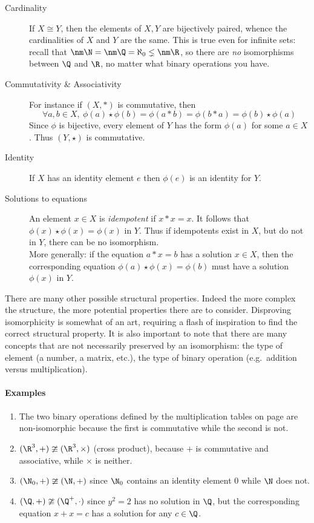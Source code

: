 \begin{description}
  \item[Cardinality] If $X\cong Y$, then the elements of $X,Y$ are bijectively paired, whence the cardinalities of $X$ and $Y$ are the same. This is true even for infinite sets: recall that $\nm\N=\nm\Q=\aleph_0\lneq \nm\R$, so there are \emph{no} isomorphisms between $\Q$ and $\R$, no matter what binary operations you have.
  \item[Commutativity \& Associativity] For instance if $(X,\ast)$ is commutative, then
  \[\forall a,b\in X,\ \phi(a)\star\phi(b)=\phi(a*b)=\phi(b*a)=\phi(b)\star\phi(a)\]
  Since $\phi$ is bijective, every element of $Y$ has the form $\phi(a)$ for some $a\in X$. Thus $(Y,\star)$ is commutative.
  \item[Identity] If $X$ has an identity element $e$ then $\phi(e)$ is an identity for $Y$.
  \item[Solutions to equations] An element $x\in X$ is \emph{idempotent} if $x*x=x$. It follows that $\phi(x)\star\phi(x)=\phi(x)$ in $Y$. Thus if idempotents exist in $X$, but do not in $Y$, there can be no isomorphism.\\
  More generally: if the equation $a*x=b$ has a solution $x\in X$, then the corresponding equation $\phi(a)\star\phi(x)=\phi(b)$ must have a solution $\phi(x)$ in $Y$.
\end{description}

There are many other possible structural properties. Indeed the more complex the structure, the more potential properties there are to consider. Disproving isomorphicity is somewhat of an art, requiring a flash of inspiration to find the correct structural property. It is also important to note that there are many concepts that are not necessarily preserved by an isomorphism: the type of element (a number, a matrix, etc.), the type of binary operation (e.g.\ addition versus multiplication).

\paragraph{Examples}
\begin{enumerate}
	\item The two binary operations defined by the multiplication tables on page \pageref{eq:commute} are non-isomorphic because the first is commutative while the second is not.
	\item $(\R^3,+)\ncong(\R^3,\times)$ (cross product), because $+$ is commutative and associative, while $\times$ is neither.
	\item $(\N_0,+)\ncong(\N,+)$ since $\N_0$ contains an identity element 0 while $\N$ does not.
	\item $(\Q,+)\ncong(\Q^+,\cdot)$ since $y^2=2$ has no solution in $\Q$, but the corresponding equation $x+x=c$ has a solution for any $c\in\Q$.
\end{enumerate}



